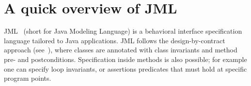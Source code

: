 


\section{A quick overview of JML} \label{prelim}
JML~\cite{JMLRefMan} (short for Java Modeling Language) is a behavioral interface specification language tailored to Java applications. JML 
follows the design-by-contract approach (see~\cite{M97oos}), where classes are annotated with class invariants and method pre- and postconditions. Specification
inside methods is also possible; for example one can specify loop invariants, or assertions  predicates that must hold at specific program points. 

